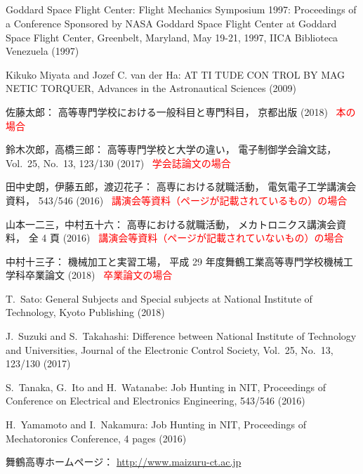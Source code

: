 \begin{center}
\section*{}                      %
\vspace*{-2zh}
\end{center}

\begin{thebibliography}{99}
	Goddard Space Flight Center:
	Flight Mechanics Symposium 1997: Proceedings of a Conference Sponsored by NASA Goddard
	 Space Flight Center at Goddard Space Flight Center, Greenbelt, Maryland, May 19-21, 1997,
	 IICA Biblioteca Venezuela (1997)

	Kikuko Miyata and Jozef C. van der Ha:
	AT TI TUDE CON TROL BY MAG NETIC TORQUER,
	Advances in the Astronautical Sciences (2009)

	佐藤太郎：
	高等専門学校における一般科目と専門科目，
	京都出版 (2018)
	\textcolor{red}{\quad\cdotfill\ 本の場合}
	
	鈴木次郎，高橋三郎：
	高等専門学校と大学の違い，
	電子制御学会論文誌，
	Vol.~25, No.~13, 123/130 (2017)
	\textcolor{red}{\quad\cdotfill\ 学会誌論文の場合}
	
	田中史朗，伊藤五郎，渡辺花子：
	高専における就職活動，
	電気電子工学講演会資料，
	543/546 (2016)
	\textcolor{red}{\quad\cdotfill\ 講演会等資料（ページが記載されているもの）の場合}
	
	山本一二三，中村五十六：
	高専における就職活動，
	メカトロニクス講演会資料，
	全 4 頁 (2016)
	\textcolor{red}{\quad\cdotfill\ 講演会等資料（ページが記載されていないもの）の場合}
	
	中村十三子：
	機械加工と実習工場，
	平成 29 年度舞鶴工業高等専門学校機械工学科卒業論文 (2018)
	\textcolor{red}{\quad\cdotfill\ 卒業論文の場合}
	
	T.~Sato: 
	General Subjects and Special subjects at National Institute of Technology, 
	Kyoto Publishing (2018)
	
	J.~Suzuki and S.~Takahashi: 
	Difference between National Institute of Technology and Universities, 
	Journal of the Electronic Control Society, 
	Vol.~25, No.~13, 123/130 (2017)
	
	S.~Tanaka, G.~Ito and H.~Watanabe: 
	Job Hunting in NIT, 
	Proceedings of Conference on Electrical and Electronics Engineering, 
	543/546 (2016)
	
	H.~Yamamoto and I.~Nakamura: 
	Job Hunting in NIT, 
	Proceedings of Mechatoronics Conference, 
	4 pages (2016)
	
	舞鶴高専ホームページ：
	\url{http://www.maizuru-ct.ac.jp}
\end{thebibliography}
